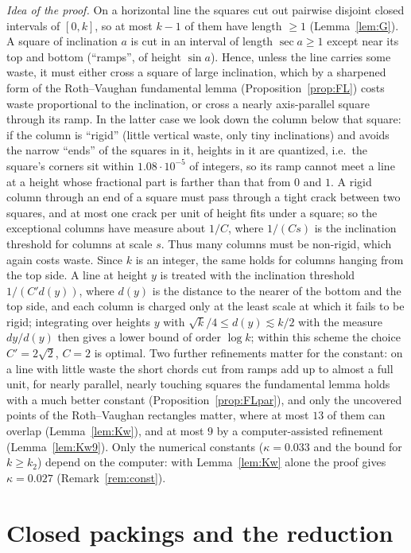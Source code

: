 \documentclass[11pt]{amsart}
\theoremstyle{definition}
\theoremstyle{remark}
\begin{document}
\noindent\emph{Idea of the proof.}
On a horizontal line the squares cut out pairwise disjoint closed intervals of $[0,k]$, so at most $k-1$ of
them have length $\ge 1$ (Lemma~\ref{lem:G}). A square of inclination $a$ is cut in an interval of length
$\sec a\ge 1$ except near its top and bottom (``ramps'', of height $\sin a$). Hence, unless the line carries
some waste, it must either cross a square of large inclination, which by a sharpened form of the Roth--Vaughan fundamental lemma (Proposition~\ref{prop:FL}) costs
waste proportional to the inclination, or cross a nearly axis-parallel square through its ramp. In the latter case
we look down the column below that square: if the column is ``rigid'' (little vertical waste, only tiny
inclinations) and avoids the narrow ``ends'' of the squares in it, heights in it are quantized, i.e.\ the square's
corners sit within $1.08\cdot10^{-5}$ of integers, so its ramp cannot meet a line at a height whose fractional part is
farther than that from $0$ and $1$. A rigid column through an end of a square must pass through a tight crack between
two squares, and at most one crack per unit of height fits under a square; so the exceptional columns have measure about
$1/C$, where $1/(Cs)$ is the inclination threshold for columns at scale $s$. Thus many columns
must be non-rigid, which again costs waste. Since $k$ is an integer, the same holds for columns hanging from the top
side. A line at height $y$ is treated with the inclination threshold $1/(C'd(y))$, where $d(y)$ is the distance to the
nearer of the bottom and the top side, and each column is charged only at the least scale at which it fails to be rigid;
integrating over heights $y$ with $\sqrt k/4\le d(y)\lesssim k/2$ with the measure $dy/d(y)$ then gives a lower bound of
order $\log k$; within this scheme the choice $C'=2\sqrt2$, $C=2$ is optimal. Two further refinements matter for the constant: on a line
with little waste the short chords cut from ramps add up to almost a full unit, for nearly parallel, nearly touching
squares the fundamental lemma holds with a much better constant (Proposition~\ref{prop:FLpar}), and only the uncovered points
of the Roth--Vaughan rectangles matter, where at most $13$ of them can overlap (Lemma~\ref{lem:Kw}), and at most $9$ by a
computer-assisted refinement (Lemma~\ref{lem:Kw9}). Only the numerical constants ($\kappa=0.033$ and the bound for $k\ge k_2$)
depend on the computer: with Lemma~\ref{lem:Kw} alone the proof gives $\kappa=0.027$ (Remark~\ref{rem:const}).

\section{Closed packings and the reduction}
\end{document}
